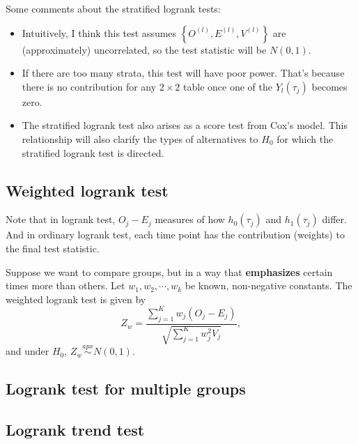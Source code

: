 \documentclass[a4paper,12pt]{article}
\begin{document}
Some comments about the stratified logrank tests:
\begin{itemize}
\item Intuitively, I think this test assumes $\left\{O^{\left(l\right)}, E^{\left(l\right)}, V^{\left(l\right)}\right\}$ are (approximately) uncorrelated, so the test statistic will be $N\left(0, 1\right)$.
\item If there are too many strata, this test will have poor power. That's because there is no contribution for any $2\times2$ table once one of the $Y_l\left(\tau_j\right)$ becomes zero.
\item The stratified logrank test also arises as a score test from Cox's model. This relationship will also clarify the types of alternatives to $H_0$ for which the stratified logrank test is directed.
\end{itemize}

\subsection{Weighted logrank test}
\label{sec:weight-logr-test}

Note that in logrank test, $O_j - E_j$ measures of how $h_0\left(\tau_j\right)$ and $h_1\left(\tau_j\right)$ differ. And in ordinary logrank test, each time point has the contribution (weights) to the final test statistic.
\par
Suppose we want to compare groups, but in a way that \textbf{emphasizes} certain times more than others. Let $w_1, w_2, \cdots, w_k$ be known, non-negative constants. The weighted logrank test is given by
\[
  Z_w = \frac{\sum\limits_{j = 1}^Kw_j\left(O_j - E_j\right)}{
    \sqrt{\sum\limits_{j = 1}^Kw_j^2V_j}
  }
  ,
\]
and under $H_0$, $Z_w \overset{apx}{\sim}N\left(0, 1\right)$.

\subsection{Logrank test for multiple groups}
\label{sec:logr-test-mult}

\subsection{Logrank trend test}
\label{sec:logrank-trend-test}







\end{document}
